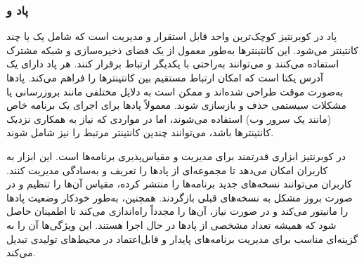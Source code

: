 \subsubsection{پاد و }
پاد در کوبرنتیز کوچک‌ترین واحد قابل استقرار و مدیریت است که شامل یک یا چند کانتینتر می‌شود. این کانتینترها به‌طور معمول از یک فضای ذخیره‌سازی و شبکه مشترک استفاده می‌کنند و می‌توانند به‌راحتی با یکدیگر ارتباط برقرار کنند. هر پاد دارای یک آدرس  یکتا است که امکان ارتباط مستقیم بین کانتینترها را فراهم می‌کند. پادها به‌صورت موقت طراحی شده‌اند و ممکن است به دلایل مختلفی مانند بروزرسانی یا مشکلات سیستمی حذف و بازسازی شوند. معمولاً پادها برای اجرای یک برنامه خاص (مانند یک سرور وب) استفاده می‌شوند، اما در مواردی که نیاز به همکاری نزدیک کانتینترها باشد، می‌توانند چندین کانتینتر مرتبط را نیز شامل شوند.

در کوبرنتیز ابزاری قدرتمند برای مدیریت و مقیاس‌پذیری برنامه‌ها است. این ابزار به کاربران امکان می‌دهد تا مجموعه‌ای از پادها را تعریف و به‌سادگی مدیریت کنند. کاربران می‌توانند نسخه‌های جدید برنامه‌ها را منتشر کرده، مقیاس آن‌ها را تنظیم و در صورت بروز مشکل به نسخه‌های قبلی بازگردند. همچنین، به‌طور خودکار وضعیت پادها را مانیتور می‌کند و در صورت نیاز، آن‌ها را مجدداً راه‌اندازی می‌کند تا اطمینان حاصل شود که همیشه تعداد مشخصی از پادها در حال اجرا هستند. این ویژگی‌ها آن را به گزینه‌ای مناسب برای مدیریت برنامه‌های پایدار و قابل‌اعتماد در محیط‌های تولیدی تبدیل می‌کند.

